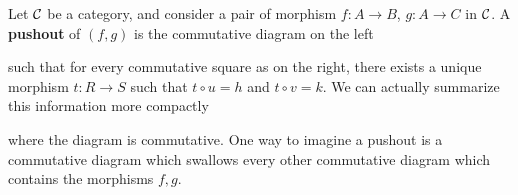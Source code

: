     \begin{definition}
    Let $\mathcal{C}$ be a category, and consider a pair of morphism $f: A
    \to B$, $g:A \to C$ in $\mathcal{C}$. A \textbf{pushout} of $(f, g)$
    is the commutative diagram on the left
    \begin{center}
        \hspace{1cm}
    \end{center}
    such that for every commutative square as on the right, there
    exists a unique morphism $t: R \to S$ such that $t \circ u =
    h$ and $t \circ v = k$. We can actually summarize this
    information more compactly
    \begin{center}
    \end{center}
    where the diagram is commutative. \textcolor{NavyBlue}{One way
    to imagine a pushout is a commutative diagram which swallows
    every other commutative diagram which contains the morphisms
    $f, g$.}
    \end{definition}

